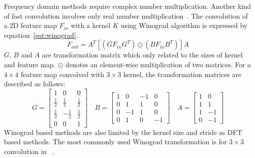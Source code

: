 Frequency domain methods require complex number multiplication. Another kind of fast convolution involves only real number multiplication~\cite{winograd1980arithmetic}. The convolution of a 2D feature map $F_{in}$ with a kernel $K$ using Winograd algorithm is expressed by equation~\ref{eqt:winograd}.
\begin{equation}\label{eqt:winograd}
    F_{out} = A^T[(GF_{in}G^T)\odot(BF_{in}B^T)]A
\end{equation}
$G$, $B$ and $A$ are transformation matrix which only related to the sizes of kernel and feature map. $\odot$ denotes an element-wise multiplication of two matrices. For a $4\times 4$ feature map convolved with $3\times 3$ kernel, the transformation matrices are described as follows:
\begin{equation*}
    G = \left[
        \begin{array}{ccc}
            1           & 0            & 0           \\
            \frac{1}{2} & \frac{1}{2}  & \frac{1}{2} \\
            \frac{1}{2} & -\frac{1}{2} & \frac{1}{2} \\
            0           & 0            & 1
        \end{array}    
    \right] \quad
    B = \left[
        \begin{array}{cccc}
            1 & 0  & -1 & 0 \\
            0 & 1  & 1  & 0 \\
            0 & -1 & 1  & 0 \\
            0 & 1  & 0  & -1
        \end{array}
    \right] \quad
    A = \left[
        \begin{array}{cc}
            1 & 0  \\
            1 & 1  \\
            1 & -1 \\
            0 & -1 
        \end{array}
    \right]
\end{equation*}
Winograd based methods are also limited by the kernel size and stride as DFT based methods. The most commonly used Winograd transformation is for $3\times 3$ convolution in ~\cite{lu2017evaluating, xiao2017exploring}. 

